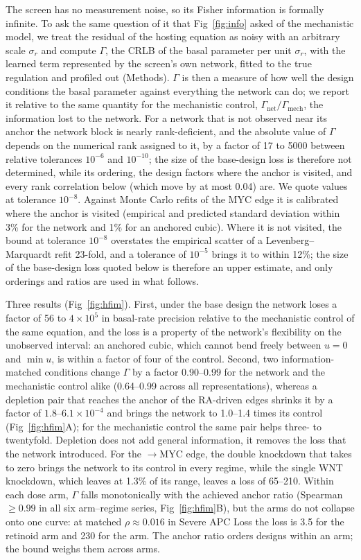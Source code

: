 The screen has no measurement noise, so its Fisher information is formally
infinite. To ask the same question of it that Fig~\ref{fig:info} asked of the
mechanistic model, we treat the residual of the hosting equation as noisy with
an arbitrary scale $\sigma_r$ and compute $\Gamma$, the CRLB of the basal parameter
per unit $\sigma_r$, with the learned term represented by the screen's own
network, fitted to the true regulation and profiled out (Methods). $\Gamma$ is then
a measure of how well the design conditions the basal parameter against
everything the network can do; we report it relative to the same quantity for
the mechanistic control, $\Gamma_{\text{net}}/\Gamma_{\text{mech}}$, the information lost
to the network. For a network that is not observed near its anchor the
network block is nearly rank-deficient, and the absolute value of $\Gamma$ depends on
the numerical rank assigned to it, by a factor of 17 to 5000 between relative
tolerances $10^{-6}$ and $10^{-10}$; the size of the base-design loss is
therefore not determined, while its ordering, the design factors where the
anchor is visited, and every rank correlation below (which move by at most 0.04)
are. We quote values at tolerance $10^{-8}$. Against Monte Carlo refits of the MYC edge it is
calibrated where the anchor is visited (empirical and predicted standard
deviation within 3\% for the network and 1\% for an anchored cubic). Where it is
not visited, the bound at tolerance $10^{-8}$ overstates the empirical scatter of
a Levenberg--Marquardt refit 23-fold, and a tolerance of $10^{-5}$ brings it to
within 12\%; the size of the base-design loss quoted below is therefore an
upper estimate, and only orderings and ratios are used in what follows.

Three results (Fig~\ref{fig:hfim}). First, under the base design the network
loses a factor of 56 to $4\times10^5$ in basal-rate precision relative to the
mechanistic control of the same equation, and the loss is a property of the
network's flexibility on the unobserved interval: an anchored cubic, which
cannot bend freely between $u=0$ and $\min u$, is within a factor of four of the
control. Second, two
information-matched conditions change $\Gamma$ by a factor 0.90--0.99 for the
network and the mechanistic control alike (0.64--0.99 across all
representations), whereas a depletion pair that reaches the anchor of the
RA-driven edges shrinks it by a factor of $1.8$--$6.1\times10^{-4}$ and brings the network
to 1.0--1.4 times its control (Fig~\ref{fig:hfim}A); for the mechanistic
control the same pair helps three- to twentyfold. Depletion does not add general
information, it removes the loss that the network introduced. For the
\bcat{}$\to$MYC edge, the double knockdown that takes \bcat{} to zero brings the
network to its control in every regime, while the single WNT knockdown, which
leaves \bcat{} at 1.3\% of its range, leaves a loss of 65--210. Within each dose
arm, $\Gamma$ falls monotonically with the achieved anchor ratio (Spearman $\ge0.99$
in all six arm--regime series, Fig~\ref{fig:hfim}B), but the arms do not
collapse onto one curve: at matched $\rho\approx0.016$ in Severe APC Loss the
loss is 3.5 for the retinoid arm and 230 for the \bcat{} arm. The anchor ratio
orders designs within an arm; the bound weighs them across arms.

